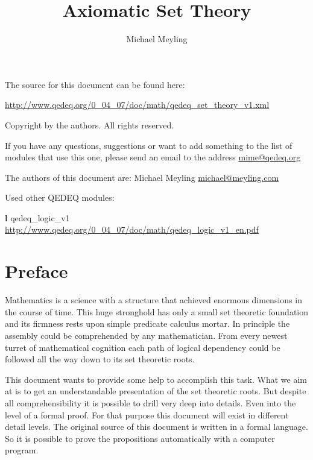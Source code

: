 \documentclass[a4paper,german,10pt,twoside]{book}
\title{Axiomatic Set Theory}
\author{
Michael Meyling
}
\theoremstyle{definition}
\theoremstyle{remark}
\begin{document}
\maketitle

\setlength{\parskip}{5pt plus 2pt minus 1pt}
\mbox{}
\vfill

\par
The source for this document can be found here:
\par
\url{http://www.qedeq.org/0_04_07/doc/math/qedeq_set_theory_v1.xml}

\par
Copyright by the authors. All rights reserved.
\par
If you have any questions, suggestions or want to add something to the list of modules that use this one, please send an email to the address \href{mailto:mime@qedeq.org}{mime@qedeq.org}

\par
The authors of this document are:
Michael Meyling \href{mailto:michael@meyling.com}{michael@meyling.com}



\par
Used other QEDEQ modules:

\par


\par
\textbf{l} qedeq\_logic\_v1 \url{http://www.qedeq.org/0_04_07/doc/math/qedeq_logic_v1_en.pdf}


\setlength{\parskip}{0pt}
\tableofcontents

\setlength{\parskip}{5pt plus 2pt minus 1pt}

\chapter*{Preface\label{ch:preface}} \label{chapter1} \hypertarget{chapter1}{}

Mathematics is a science with a structure that achieved enormous dimensions in the course of time. This huge stronghold has only a small set theoretic foundation and its firmness rests upon simple predicate calculus mortar. In principle the assembly could be comprehended by any mathematician. From every newest turret of mathematical cognition each path of logical dependency could be followed all the way down to its set theoretic roots.

\par
This document wants to provide some help to accomplish this task. What we aim at is to get an understandable
presentation of the set theoretic roots. But despite all comprehensibility it is possible to drill very deep into details. Even into the level of a formal proof. For that purpose this document will exist in different detail levels. The original source of this document is written in a formal language. So it is possible to prove the propositions automatically with a computer program.
\end{document}
